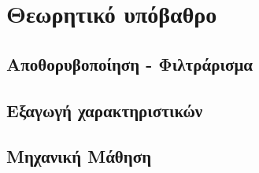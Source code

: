 \documentclass[11pt,a4paper,english,greek,twoside]{../Thesis}
\begin{document}
\chapter{Θεωρητικό υπόβαθρο}\label{chap:Background}

\section{Αποθορυβοποίηση - Φιλτράρισμα}

\section{Εξαγωγή χαρακτηριστικών}

\section{Μηχανική Μάθηση}
\end{document}
